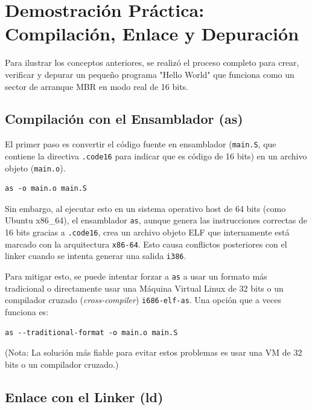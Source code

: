 \newpage %

\section{Demostración Práctica: Compilación, Enlace y Depuración}

Para ilustrar los conceptos anteriores, se realizó el proceso completo para crear, verificar y depurar un pequeño programa "Hello World" que funciona como un sector de arranque MBR en modo real de 16 bits.

\subsection{Compilación con el Ensamblador (as)}

El primer paso es convertir el código fuente en ensamblador (\texttt{main.S}, que contiene la directiva \texttt{.code16} para indicar que es código de 16 bits) en un archivo objeto (\texttt{main.o}).

\begin{lstlisting}[style=BashInputStyle, caption=Comando de ensamblaje inicial]
as -o main.o main.S
\end{lstlisting}

Sin embargo, al ejecutar esto en un sistema operativo host de 64 bits (como Ubuntu x86\_64), el ensamblador \texttt{as}, aunque genera las instrucciones correctas de 16 bits gracias a \texttt{.code16}, crea un archivo objeto ELF que internamente está marcado con la arquitectura \texttt{x86-64}. Esto causa conflictos posteriores con el linker cuando se intenta generar una salida \texttt{i386}.

Para mitigar esto, se puede intentar forzar a \texttt{as} a usar un formato más tradicional o directamente usar una Máquina Virtual Linux de 32 bits o un compilador cruzado (\textit{cross-compiler}) \texttt{i686-elf-as}. Una opción que a veces funciona es:
\begin{lstlisting}[style=BashInputStyle, caption=Intento de comando de ensamblaje (puede variar)]
as --traditional-format -o main.o main.S
\end{lstlisting}
(Nota: La solución más fiable para evitar estos problemas es usar una VM de 32 bits o un compilador cruzado.)

\subsection{Enlace con el Linker (ld)}

